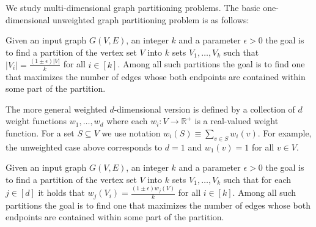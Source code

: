 We study multi-dimensional graph partitioning problems. The basic one-dimensional unweighted graph partitioning problem is as follows: 

\begin{definition}
	Given an input graph $G(V, E)$, an integer $k$ and a parameter $\epsilon > 0$ the goal is to find a partition of the vertex set $V$ into $k$ sets $V_1, \dots, V_k$ such that $|V_i| = \frac{(1\pm \epsilon) |V|}{k}$ for all $i \in [k]$. Among all such partitions the goal is to find one that maximizes the number of edges whose both endpoints are contained within some part of the partition. 
\end{definition}

The more general weighted $d$-dimensional version is defined by a collection of $d$ weight functions $w_1, \dots, w_d$ where each $w_i \colon V \to \mathbb R^+$ is a real-valued weight function. For a set $S \subseteq V$ we use notation $w_i(S) \equiv \sum_{v \in S} w_i(v)$. For example, the unweighted case above corresponds to $d = 1$ and $w_1(v) = 1$ for all $v \in V$.

\begin{definition}
	Given an input graph $G(V, E)$, an integer $k$ and a parameter $\epsilon > 0$ the goal is to find a partition of the vertex set $V$ into $k$ sets $V_1, \dots, V_k$ such that for each $j \in [d]$ it holds that  $w_j(V_i) = \frac{(1\pm \epsilon) w_j(V)}{k}$ for all $i \in [k]$. Among all such partitions the goal is to find one that maximizes the number of edges whose both endpoints are contained within some part of the partition. 
\end{definition}

